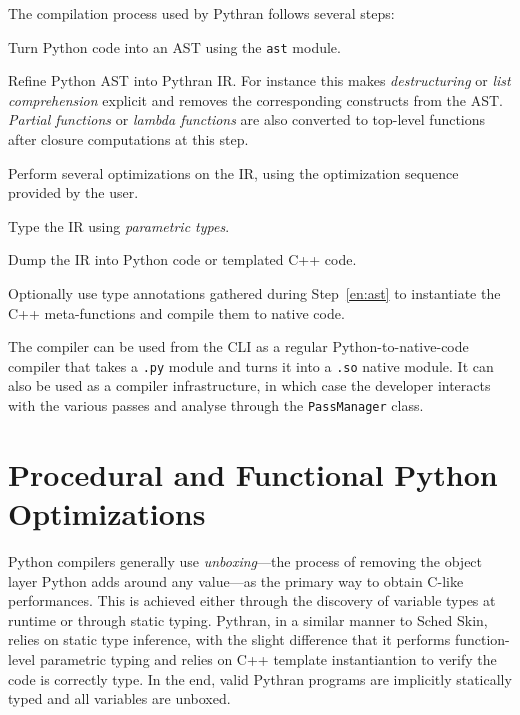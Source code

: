 \documentclass{llncs}
\begin{document}
The compilation process used by Pythran follows several steps:
\begin{inparaenum}[1)]
\item\label{en:ast} Turn Python code into an \ac{AST} using the \texttt{ast}
    module.
\item Refine Python \ac{AST} into Pythran \ac{IR}. For instance this makes
    \emph{destructuring} or \emph{list comprehension} explicit and removes the
    corresponding constructs from the \ac{AST}. \emph{Partial functions} or
    \emph{lambda functions} are also converted to top-level functions after
    closure computations at this step.
\item Perform several optimizations on the \ac{IR}, using the optimization
    sequence provided by the user.
\item Type the \ac{IR} using \emph{parametric types}.
\item Dump the \ac{IR} into Python code or templated C++ code.
\item Optionally use type annotations gathered during Step~\ref{en:ast} to
    instantiate the C++ meta-functions and compile them to native code.
\end{inparaenum}

The compiler can be used from the \ac{CLI} as a regular Python-to-native-code
compiler that takes a \texttt{.py} module and turns it into a \texttt{.so}
native module. It can also be used as a compiler infrastructure, in which case
the developer interacts with the various passes and analyse through the
\texttt{PassManager} class.

\section{Procedural and Functional Python Optimizations}
\label{sec:functionnal-optim}

Python compilers generally use \emph{unboxing}---the process of removing the
object layer Python adds around any value---as the primary way to obtain
C-like performances. This is achieved either through the discovery of variable
types at runtime or through static typing. Pythran, in a similar manner to
Sched Skin, relies on static type inference, with the slight difference that it
performs function-level parametric typing and relies on C++ template
instantiantion to verify the code is correctly type. In the end, valid Pythran
programs are implicitly statically typed and all variables are unboxed.
\end{document}
